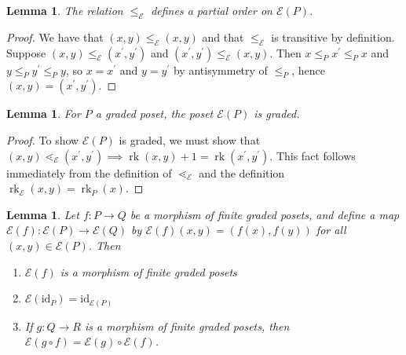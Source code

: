 \documentclass[smallextended, envcountsame, numbook]{svjour3}
\theoremstyle{plain}
\newtheorem{lem}[thm]{Lemma}
\theoremstyle{definition}
\theoremstyle{remark}
\numberwithin{equation}{section}
\newcommand{\id}{\mathrm{id}}
\newcommand\rk{\operatorname{rk}}
\begin{document}
\begin{lem}\label{lem:f_partial_order}
The relation $\le_{\mathcal E}$ defines a partial order on $\mathcal E(P)$.
\end{lem}

\begin{proof}
We have that $(x, y)\le_{\mathcal E} (x, y)$ and that $\le_{\mathcal E}$ is transitive by definition.  Suppose $(x, y)\le_{\mathcal E} (x^\prime, y^\prime)$ and $(x^\prime, y^\prime)\le_{\mathcal E} (x, y)$.  Then $x\le_P x^\prime \le_P x$ and $y\le_P y^\prime \le_P y$, so $x = x^\prime$ and $y=y^\prime$ by antisymmetry of $\le_P$, hence $(x, y) = (x^\prime, y^\prime)$.
\end{proof}

\begin{lem}\label{lem:FP_graded_poset}
For $P$ a graded poset, the poset $\mathcal E(P)$ is graded.
\end{lem}

\begin{proof}
To show $\mathcal E(P)$ is graded, we must show that $(x, y) \lessdot_{\mathcal E} (x^\prime, y^\prime) \implies \rk(x, y)+1 = \rk(x^\prime , y^\prime)$.  This fact follows immediately from the definition of $\lessdot_{\mathcal E}$ and the definition $\rk_{\mathcal E}(x, y) = \rk_P(x)$.
\end{proof}

\begin{lem}\label{lem:Ff_poset_morphism}
Let $f\colon P\rightarrow Q$ be a morphism of finite graded posets, and define a map $\mathcal E(f)\colon \mathcal E(P)\rightarrow \mathcal E(Q)$ by $\mathcal{E}(f)(x,y) = (f(x),f(y))$ for all $(x,y)\in \mathcal{E}(P)$.  Then

\begin{enumerate}
\item $\mathcal{E}(f)$ is a morphism of finite graded posets
\item $\mathcal{E}(\id_P) = \id_{\mathcal{E}(P)}$
\item If $g\colon Q\rightarrow R$ is a morphism of finite graded posets, then $\mathcal E(g\circ f) = \mathcal E(g)\circ\mathcal E(f)$.
\end{enumerate}
\end{lem}
\end{document}
